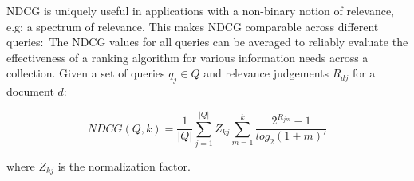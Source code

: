 NDCG is uniquely useful in applications with a non-binary notion of relevance, e.g: a spectrum of relevance.
This makes NDCG comparable across different queries:\
The NDCG values for all queries can be averaged to reliably evaluate the effectiveness of a ranking algorithm for various information needs across a collection.
Given a set of queries $ q_j \in Q $ and relevance judgements $ R_{dj} $ for a document $ d $:\

\begin{equation}
NDCG(Q, k) = \frac{1}{|Q|} \sum ^{|Q|} _{j = 1} Z_{kj} \sum ^k _{m = 1} \frac{2^{R_{jm}} - 1}{log_2 (1 + m)'}
\end{equation}

where $ Z_{kj} $ is the normalization factor.